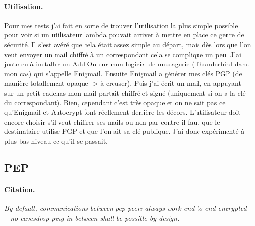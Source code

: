 \paragraph*{Utilisation.}
Pour mes tests j’ai fait en sorte de trouver l’utilisation la plus simple possible pour voir si un utilisateur lambda pouvait arriver à mettre en place ce genre de sécurité. Il s’est avéré que cela était assez simple au départ, mais dès lors que l'on veut envoyer un mail chiffré à un correspondant cela se complique un peu. J’ai juste eu à installer un Add-On sur mon logiciel de messagerie (Thunderbird dans mon cas) qui s’appelle Enigmail. Ensuite Enigmail a générer mes clés PGP (de manière totallement opaque -> à creuser). Puis j’ai écrit un mail, en appuyant sur un petit cadenas mon mail partait chiffré et signé (uniquement si on a la clé du correspondant). Bien, cependant c’est très opaque et on ne sait pas ce qu'Enigmail et Autocrypt font réellement derrière les décors. L’utilisateur doit encore choisir s’il veut chiffrer ses mails ou non par contre il faut que le destinataire utilise PGP et que l’on ait sa clé publique. 
J’ai donc expérimenté à plus bas niveau ce qu’il se passait.
\subsection{PEP}
\paragraph*{Citation.}
\textit{By default, communications between pep peers always work end-to-end encrypted – no eavesdrop-ping in between shall be possible by design.}
